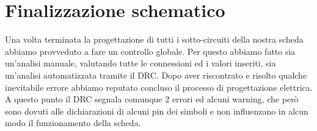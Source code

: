 \hypertarget{finalizzazione schematico}{%
\section{Finalizzazione schematico}\label{finalizzazione schematico}}

Una volta terminata la progettazione di tutti i sotto-circuiti della 
nostra scheda abbiamo provveduto a fare un controllo globale. Per questo abbiamo fatto 
sia un’analisi manuale, valutando tutte le connessioni ed i valori inseriti, sia un’analisi 
automatizzata tramite il DRC. Dopo aver riscontrato e risolto qualche inevitabile errore 
abbiamo reputato concluso il processo di progettazione elettrica. A questo punto il DRC 
segnala comunque 2 errori ed alcuni warning, che però sono dovuti alle dichiarazioni di alcuni 
pin dei simboli e non influenzano in alcun modo il funzionamento della scheda.
